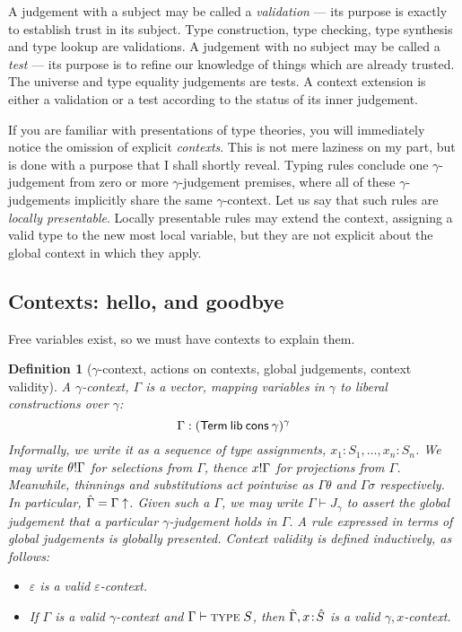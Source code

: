 \documentclass{jfp1}
\newtheorem{definition}[theorem]{Definition}
\newcommand{\emp}{\varepsilon}
\begin{document}
A judgement with a subject may be called a \emph{validation} --- its
purpose is exactly to establish trust in its subject. Type construction, type checking, type synthesis and type lookup are validations. A judgement with no subject may be called a
\emph{test} --- its purpose is to refine our knowledge of things which are already trusted.
The universe and type equality judgements are tests. A context extension is either a validation
or a test according to the status of its inner judgement.

If you are familiar with presentations of type theories, you will immediately notice the
omission of explicit \emph{contexts}. This is not mere laziness on my part, but is done
with a purpose that I shall shortly reveal. Typing rules conclude one $\gamma$-judgement
from zero or more $\gamma$-judgement premises, where all of these $\gamma$-judgements
implicitly share the same $\gamma$-context. Let us say that such rules are \emph{locally presentable}.
Locally presentable rules may extend the context, assigning a valid type to the new most local
variable, but they are not explicit about the global context in which they apply.


\subsection{Contexts: hello, and goodbye}

Free variables exist, so we must have contexts to explain them.

\begin{definition}[$\gamma$-context, actions on contexts, global
  judgements, context validity]
  A $\gamma$-context, $\Gamma$ is a vector, mapping variables in $\gamma$ to
  liberal constructions over $\gamma$:
  \[
    \Gamma : (\mathsf{Term}\:\mathsf{lib}\:\mathsf{cons}\:\gamma)^\gamma
    \]
  Informally, we write it as a sequence of type assignments,
  $x_1:S_1,\ldots,x_n:S_n$. We may write $\theta!\Gamma$ for selections
  from $\Gamma$, thence $x!\Gamma$ for projections from
  $\Gamma$. Meanwhile, thinnings and substitutions act pointwise as
  $\Gamma\theta$ and $\Gamma\sigma$ respectively. In particular, $\hat\Gamma = \Gamma\uparrow$.
  Given such a $\Gamma$, we may write $\Gamma\vdash J_\gamma$ to assert
  the \emph{global judgement} that a particular $\gamma$-judgement holds in $\Gamma$.
  A rule expressed in terms of global judgements is \emph{globally
    presented}.
  Context \emph{validity} is defined inductively, as follows:
  \begin{itemize}
  \item $\emp$ is a valid $\emp$-context.
  \item If $\Gamma$ is a valid $\gamma$-context and $\Gamma\vdash\textsc{type}\;S$, then $\hat\Gamma,x\!:\!\hat S$ is a valid $\gamma,x$-context.
  \end{itemize}
\end{definition}
\end{document}
